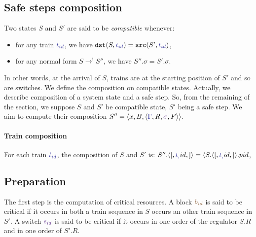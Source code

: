 \documentclass[runningheads]{llncs}
\newcommand{\tuple}[1]{\ensuremath{\langle #1\rangle}}
\newcommand{\posFmt}[1]{{\color{poscolor}{#1}}}
\newcommand{\bid}[1]{\ensuremath{\posFmt{b_{#1}}}}
\newcommand{\swFmt}[1]{{\color{swcolor}{#1}}}
\newcommand{\sid}[1]{\ensuremath{\swFmt{s_{#1}}}}
\newcommand{\switches}{\ensuremath{\swFmt{\sigma}}}
\newcommand{\trainFmt}[1]{{\color{traincolor} #1}}
\newcommand{\trainSeq}{\trainFmt{\Gamma\xspace}}
\newcommand{\tid}[1]{\ensuremath{\trainFmt{t_{#1}}}}
\newcommand{\regulator}{\ensuremath{R}}
\newcommand{\signals}{\ensuremath{F}}
\newcommand{\stateTuple}[4]{\tuple{#1, #2, #3, #4}}
\newcommand{\reduces}{\ensuremath{\rightarrow}}
\newcommand{\redTuple}[3]{\ensuremath{\tuple{#1, #2, #3}}}
\begin{document}
\subsection{Safe steps composition}

Two states $S$ and $S'$ are said to be \emph{compatible} whenever:
\begin{itemize}
\item for any train $\tid{id}$, we have $\mathtt{dst}(S, \tid{id})  =  \mathtt{src}(S', \tid{id})$,
\item for any normal form $S \reduces^! S''$, we have $S''.\sigma = S'.\sigma$.
\end{itemize}
In other words, at the arrival of $S$, trains are at the starting position of $S'$ and so are switches. We define the composition on compatible states. Actually, we describe composition of a system state and a safe step. So, from the remaining of the section, we suppose $S$ and $S'$ be compatible state, $S'$ being a safe step. We aim to compute their composition $S''  = \redTuple{x}{B}{\stateTuple{\trainSeq}{\regulator}{\switches}{\signals}}$.

\paragraph{Train composition} For each train $\tid{id}$, the composition of $S$ and $S'$ is: $S''.\stateTuple[\tid{id}] = \langle S.\stateTuple[\tid{id}].pid$, 



\subsection{Preparation}

The first step is the computation of critical resources. A block $\bid{id}$ is said to be critical if it occurs in both a train sequence in $S$ occurs an other train sequence in $S'$. A switch $\sid{id}$ is said to be critical if it occurs in one order of the regulator $S.R$ and in one order of $S'.R$. 



\end{document}
